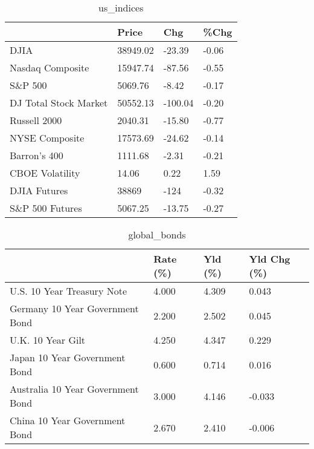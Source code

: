 \documentclass{article}%
\begin{document}
%


\begin{table}[htbp]%
\caption{us\_indices}%
\centering%
\begin{adjustbox}{width=1\textwidth}%
\begin{tabular}{llll}
\toprule
                      &    Price &     Chg &  \%Chg \\
\midrule
                 DJIA & 38949.02 &  -23.39 & -0.06 \\
     Nasdaq Composite & 15947.74 &  -87.56 & -0.55 \\
              S\&P 500 &  5069.76 &   -8.42 & -0.17 \\
DJ Total Stock Market & 50552.13 & -100.04 & -0.20 \\
         Russell 2000 &  2040.31 &  -15.80 & -0.77 \\
       NYSE Composite & 17573.69 &  -24.62 & -0.14 \\
         Barron's 400 &  1111.68 &   -2.31 & -0.21 \\
      CBOE Volatility &    14.06 &    0.22 &  1.59 \\
         DJIA Futures &    38869 &    -124 & -0.32 \\
      S\&P 500 Futures &  5067.25 &  -13.75 & -0.27 \\
\bottomrule
\end{tabular}
%
\end{adjustbox}%
\end{table}

%


\begin{table}[htbp]%
\caption{global\_bonds}%
\centering%
\begin{adjustbox}{width=1\textwidth}%
\begin{tabular}{llll}
\toprule
                                  & Rate (\%) & Yld (\%) & Yld Chg (\%) \\
\midrule
       U.S. 10 Year Treasury Note &    4.000 &   4.309 &       0.043 \\
  Germany 10 Year Government Bond &    2.200 &   2.502 &       0.045 \\
                U.K. 10 Year Gilt &    4.250 &   4.347 &       0.229 \\
    Japan 10 Year Government Bond &    0.600 &   0.714 &       0.016 \\
Australia 10 Year Government Bond &    3.000 &   4.146 &      -0.033 \\
    China 10 Year Government Bond &    2.670 &   2.410 &      -0.006 \\
\bottomrule
\end{tabular}
%
\end{adjustbox}%
\end{table}
\end{document}
